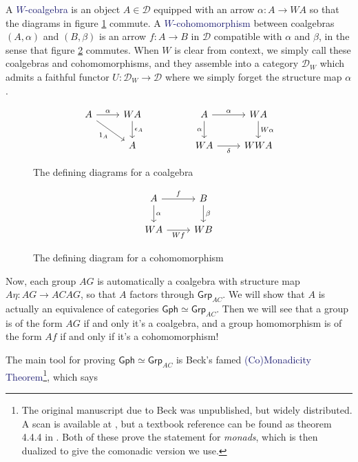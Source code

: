 \documentclass[12pt]{article}
\theoremstyle{definition}
\theoremstyle{theorem}
\newcommand*{\catFont}[1]{\mathsf{#1}}
\newcommand*{\catVarFont}[1]{\mathcal{#1}}
\newcommand{\Grp}{\catFont{Grp}}
\newcommand{\catD}{\catVarFont{D}}
\newcommand*{\important}[1]{\textcolor{MidnightBlue}{#1}}
\begin{document}
A \important{$W$-coalgebra} is an object
$A \in \catD$ equipped with an arrow $\alpha : A \to WA$ so that the
diagrams in figure \ref{coalg} commute. A \important{$W$-cohomomorphism}
between coalgebras $(A,\alpha)$ and $(B,\beta)$ is an arrow $f : A \to B$
in $\mathcal{D}$ compatible with $\alpha$ and $\beta$, in the sense that 
figure \ref{cohom} commutes. When $W$ is clear from context, we simply call these
coalgebras and cohomomorphisms, and they assemble into a category $\catD_W$
which admits a faithful functor $U : \catD_W \to \catD$ where we 
simply forget the structure map $\alpha$.

\begin{figure}
    \caption{The defining diagrams for a coalgebra}
    \label{coalg}
    \[
        \begin{tikzcd}
        A & WA && A & WA \\
        & A && WA & WWA
        \arrow["\alpha", from=1-1, to=1-2]
        \arrow["{\epsilon_A}", from=1-2, to=2-2]
        \arrow["{1_A}"', from=1-1, to=2-2]
        \arrow["\alpha"', from=1-4, to=2-4]
        \arrow["\alpha", from=1-4, to=1-5]
        \arrow["\delta"', from=2-4, to=2-5]
        \arrow["W\alpha", from=1-5, to=2-5]
        \end{tikzcd}
    \]
\end{figure}

\begin{figure}
    \caption{The defining diagram for a cohomomorphism}
    \label{cohom}
    \[
        \begin{tikzcd}
        A & B \\
        WA & WB
        \arrow["\alpha", from=1-1, to=2-1]
        \arrow["\beta", from=1-2, to=2-2]
        \arrow["f", from=1-1, to=1-2]
        \arrow["Wf"', from=2-1, to=2-2]
        \end{tikzcd}
    \]    
\end{figure}

Now, each group $AG$ is automatically a coalgebra with structure map
$A \eta : AG \to ACAG$, so that $A$ factors through $\Grp_{AC}$.
We will show that $A$ is actually an equivalence of categories 
$\mathsf{Gph} \simeq \Grp_{AC}$. Then we will see that a group is of the
form $AG$ if and only it's a coalgebra, and a group homomorphism is of the
form $Af$ if and only if it's a cohomomorphism!

The main tool for proving $\mathsf{Gph} \simeq \Grp_{AC}$ is Beck's famed
\important{(Co)Monadicity Theorem}\footnote{The original manuscript due to Beck 
was unpublished, but widely distributed. A scan is available at
\cite{beckBeckMonadicityTheoremPdf}, but a textbook reference can be
found as theorem 4.4.4 in \cite{borceuxCategoriesStructures1994}. Both of 
these prove the statement for \emph{monads}, which is then dualized to give
the comonadic version we use.}, which says
\end{document}
